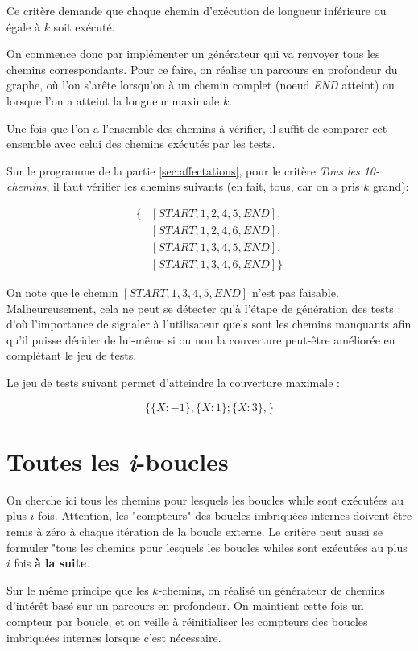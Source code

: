 Ce critère demande que chaque chemin d'exécution de longueur inférieure ou égale à $k$ soit exécuté.

On commence donc par implémenter un générateur qui va renvoyer tous les chemins correspondants. Pour ce faire, on réalise un parcours en profondeur du graphe, où l'on s'arête lorsqu'on à un chemin complet (noeud \textit{END} atteint) ou lorsque l'on a atteint la longueur maximale $k$.

Une fois que l'on a l'ensemble des chemins à vérifier, il suffit de comparer cet ensemble avec celui des chemins exécutés par les tests.

Sur le programme de la partie \ref{sec:affectations}, pour le critère \textit{Tous les 10-chemins}, il faut vérifier les chemins suivants (en fait, tous, car on a pris $k$ grand):

\begin{align*}
\{
	&[START, 1, 2, 4, 5, END],\\
	&[START, 1, 2, 4, 6, END],\\
	&[START, 1, 3, 4, 5, END],\\
	&[START, 1, 3, 4, 6, END]
\}
\end{align*}

On note que le chemin $[START, 1, 3, 4, 5, END]$ n'est pas faisable. Malheureusement, cela ne peut se détecter qu'à l'étape de génération des tests  : d'où l'importance de signaler à l'utilisateur quels sont les chemins manquants afin qu'il puisse décider de lui-même si ou non la couverture peut-être améliorée en complétant le jeu de tests.

Le jeu de tests suivant permet d'atteindre la couverture maximale :

\[ \{
	\{ X : -1\},
	\{ X : 1\};
	\{ X : 3\},
\} \]


\section{Toutes les \textit{i}-boucles}

On cherche ici tous les chemins pour lesquels les boucles while sont exécutées au plus $i$ fois. Attention, les "compteurs" des boucles imbriquées internes doivent être remis à zéro à chaque itération de la boucle externe. Le critère peut aussi se formuler "tous les chemins pour lesquels les boucles whiles sont exécutées au plus $i$ fois \textbf{à la suite}.

Sur le même principe que les $k$-chemins, on réalisé un générateur de chemins d'intérêt basé sur un parcours en profondeur. On maintient cette fois un compteur par boucle, et on veille à réinitialiser les compteurs des boucles imbriquées internes lorsque c'est nécessaire.


